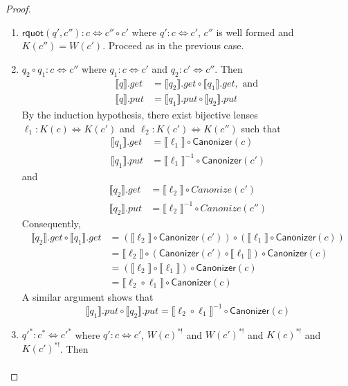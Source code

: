 \documentclass[acmsmall,review,anonymous]{acmart}
\newcommand{\kw}[1]{\ensuremath{\mathsf{#1}}}
\newcommand{\canonizer}{\ensuremath{\kw{Canonizer}}}
\begin{document}
\begin{proof}
\begin{enumerate}
\item
$\kw{rquot}(q', c''):c \Leftrightarrow c'' \circ c'$ where $q' : c \Leftrightarrow
c'$, $c''$ is well formed and $K(c'') = W(c')$. Proceed as in the previous
case.
\item
$q_2 \circ q_1: c \Leftrightarrow c''$ where $q_1 : c \Leftrightarrow c'$ and
$q_2 : c' \Leftrightarrow c''$. Then
\begin{align*}
\llbracket q \rrbracket.get &= \llbracket q_2 \rrbracket.get\circ \llbracket
q_1 \rrbracket.get, \text{ and }\\
\llbracket q \rrbracket.put &= \llbracket q_1 \rrbracket.put \circ \llbracket
q_2 \rrbracket.put
\end{align*}
By the induction hypothesis, there exist bijective lenses
$\ell_1 :
K(c) \Leftrightarrow K(c')$ and $\ell_2 : K(c') \Leftrightarrow K(c'')$ such
that
\begin{align*}
\llbracket q_1 \rrbracket.get &= \llbracket \ell_1 \rrbracket \circ
\canonizer(c)\\
\llbracket q_1 \rrbracket.put &= {\llbracket \ell_1 \rrbracket}^{-1} \circ
\canonizer(c')
\end{align*}
and
\begin{align*}
\llbracket q_2 \rrbracket.get &= \llbracket \ell_2 \rrbracket \circ
Canonize(c')\\
\llbracket q_2 \rrbracket.put &= {\llbracket \ell_2 \rrbracket}^{-1} \circ
Canonize(c'')
\end{align*}
Consequently,
\begin{align*}
\llbracket q_2 \rrbracket.get \circ \llbracket q_1 \rrbracket.get &=
(\llbracket \ell_2 \rrbracket \circ \canonizer(c')) \circ (\llbracket \ell_1
\rrbracket \circ \canonizer(c))\\
&= \llbracket \ell_2 \rrbracket \circ (\canonizer(c') \circ \llbracket \ell_1
\rrbracket) \circ \canonizer(c)\\
&= (\llbracket \ell_2 \rrbracket \circ \llbracket \ell_1 \rrbracket) \circ
\canonizer(c)\\
&= \llbracket \ell_2  \circ  \ell_1 \rrbracket \circ
\canonizer(c)
\end{align*}
A similar argument shows that
$$\llbracket q_1 \rrbracket.put \circ \llbracket q_2 \rrbracket.put =
\llbracket \ell_2  \circ  \ell_1 \rrbracket^{-1} \circ
\canonizer(c)$$
\item
${q'}^* : c^* \Leftrightarrow {c'}^*$ where $q' : c \Leftrightarrow c'$,
$W(c)^{*!}$ and $W(c')^{*!}$ and $K(c)^{*!}$ and $K(c')^{*!}$. Then
\begin{align*}

\end{align*}
\end{enumerate}
\end{proof}
\end{document}
